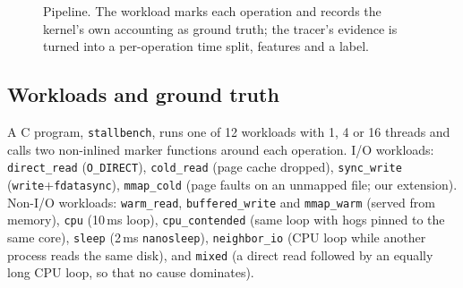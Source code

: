 \documentclass[conference]{IEEEtran}
\begin{document}
\begin{figure}[t]
\centering
{}
\caption{Pipeline. The workload marks each operation and records the kernel's own accounting as ground truth; the tracer's evidence is turned into a per-operation time split, features and a label.}
\label{fig:arch}
\end{figure}

\subsection{Workloads and ground truth}
A C program, \texttt{stallbench}, runs one of 12 workloads with 1, 4 or 16 threads and calls two non-inlined marker functions around each operation. I/O workloads: \texttt{direct\_read} (\texttt{O\_DIRECT}), \texttt{cold\_read} (page cache dropped), \texttt{sync\_write} (\texttt{write}+\texttt{fdatasync}), \texttt{mmap\_cold} (page faults on an unmapped file; our extension). Non-I/O workloads: \texttt{warm\_read}, \texttt{buffered\_write} and \texttt{mmap\_warm} (served from memory), \texttt{cpu} (10\,ms loop), \texttt{cpu\_contended} (same loop with hogs pinned to the same core), \texttt{sleep} (2\,ms \texttt{nanosleep}), \texttt{neighbor\_io} (CPU loop while another process reads the same disk), and \texttt{mixed} (a direct read followed by an equally long CPU loop, so that no cause dominates).
\end{document}
